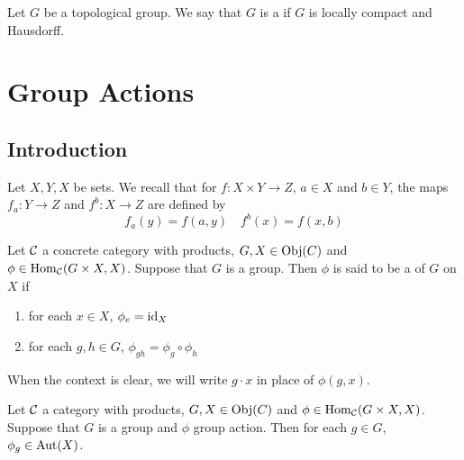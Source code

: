 \documentclass{book}
\begin{document}
	\begin{defn}  
		Let $G$ be a topological group. We say that $G$ is a  if $G$ is locally compact and Hausdorff.
	\end{defn}






























	\newpage
	\section{Group Actions}
	
	\subsection{Introduction}
	
	\begin{note}
		Let $X,Y,X$ be sets. We recall that for $f:X \times Y \rightarrow Z$, $a \in X$ and $b \in Y$, the maps $f_a:Y \rightarrow Z$ and $f^b:X \rightarrow Z$ are defined by 
		$$f_a(y) = f(a,y) \quad f^b(x) = f(x, b)$$
	\end{note}
	
	\begin{defn}
		Let $\mathcal{C}$ a concrete category with products, $G, X \in \operatorname{Obj}(C)$ and $\phi \in \operatorname{Hom}_{\mathcal{C}}( G \times X,  X)$. Suppose that $G$ is a group. Then $\phi$ is said to be a  of $G$ on $X$ if 
		\begin{enumerate}
			\item for each $x \in X$, $\phi_e = \operatorname{id}_X$ 
			\item for each $g, h \in G$, $\phi_{gh} = \phi_g \circ \phi_h$
		\end{enumerate}
	\end{defn}

	\begin{note}
		When the context is clear, we will write $g \cdot x$ in place of $\phi(g, x)$. 
	\end{note}

	\begin{ex}
		Let $\mathcal{C}$ a category with products, $G, X \in \operatorname{Obj}(C)$ and $\phi \in \operatorname{Hom}_{\mathcal{C}}( G \times X,  X)$. Suppose that $G$ is a group and $\phi$ group action. Then for each $g \in G$, $\phi_g \in \operatorname{Aut}(X)$.
	\end{ex}
\end{document}
